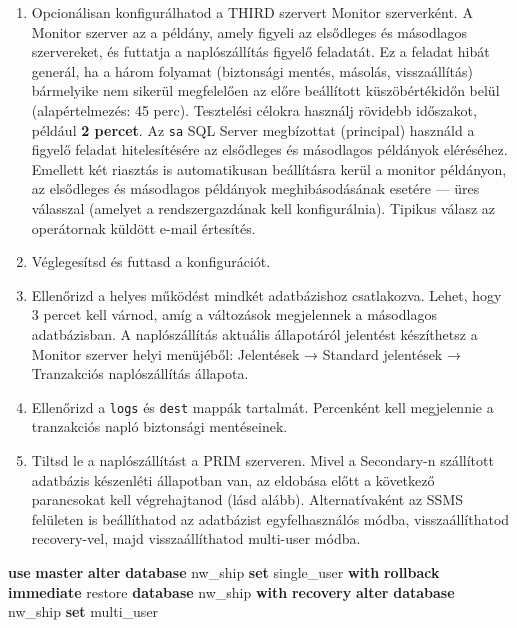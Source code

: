 \documentclass[
  magyar,
]{article}
\newenvironment{Shaded}{}{}
\newcommand{\KeywordTok}[1]{\textcolor[rgb]{0.00,0.44,0.13}{\textbf{#1}}}
\newcommand{\NormalTok}[1]{#1}
\begin{document}
\begin{enumerate}
\def\labelenumi{\arabic{enumi}.}
\setcounter{enumi}{8}
\item
  Opcionálisan konfigurálhatod a THIRD szervert Monitor szerverként. A
  Monitor szerver az a példány, amely figyeli az elsődleges és
  másodlagos szervereket, és futtatja a naplószállítás figyelő
  feladatát. Ez a feladat hibát generál, ha a három folyamat (biztonsági
  mentés, másolás, visszaállítás) bármelyike nem sikerül megfelelően az
  előre beállított küszöbértékidőn belül (alapértelmezés: 45 perc).
  Tesztelési célokra használj rövidebb időszakot, például \textbf{2
  percet}. Az \texttt{sa} SQL Server megbízottat (principal) használd a
  figyelő feladat hitelesítésére az elsődleges és másodlagos példányok
  eléréséhez. Emellett két riasztás is automatikusan beállításra kerül a
  monitor példányon, az elsődleges és másodlagos példányok
  meghibásodásának esetére --- üres válasszal (amelyet a
  rendszergazdának kell konfigurálnia). Tipikus válasz az operátornak
  küldött e-mail értesítés.
\item
  Véglegesítsd és futtasd a konfigurációt.
\item
  Ellenőrizd a helyes működést mindkét adatbázishoz csatlakozva. Lehet,
  hogy 3 percet kell várnod, amíg a változások megjelennek a másodlagos
  adatbázisban. A naplószállítás aktuális állapotáról jelentést
  készíthetsz a Monitor szerver helyi menüjéből: Jelentések → Standard
  jelentések → Tranzakciós naplószállítás állapota.
\item
  Ellenőrizd a \texttt{logs} és \texttt{dest} mappák tartalmát.
  Percenként kell megjelennie a tranzakciós napló biztonsági
  mentéseinek.
\item
  Tiltsd le a naplószállítást a PRIM szerveren. Mivel a Secondary-n
  szállított adatbázis készenléti állapotban van, az eldobása előtt a
  következő parancsokat kell végrehajtanod (lásd alább). Alternatívaként
  az SSMS felületen is beállíthatod az adatbázist egyfelhasználós módba,
  visszaállíthatod recovery-vel, majd visszaállíthatod multi-user módba.
\end{enumerate}

\begin{Shaded}
\begin{Highlighting}[]
\KeywordTok{use} \KeywordTok{master}
\KeywordTok{alter} \KeywordTok{database}\NormalTok{ nw\_ship }\KeywordTok{set}\NormalTok{ single\_user }\KeywordTok{with} \KeywordTok{rollback} \KeywordTok{immediate}
\NormalTok{restore }\KeywordTok{database}\NormalTok{ nw\_ship }\KeywordTok{with} \KeywordTok{recovery}
\KeywordTok{alter} \KeywordTok{database}\NormalTok{ nw\_ship }\KeywordTok{set}\NormalTok{ multi\_user}
\end{Highlighting}
\end{Shaded}
\end{document}
